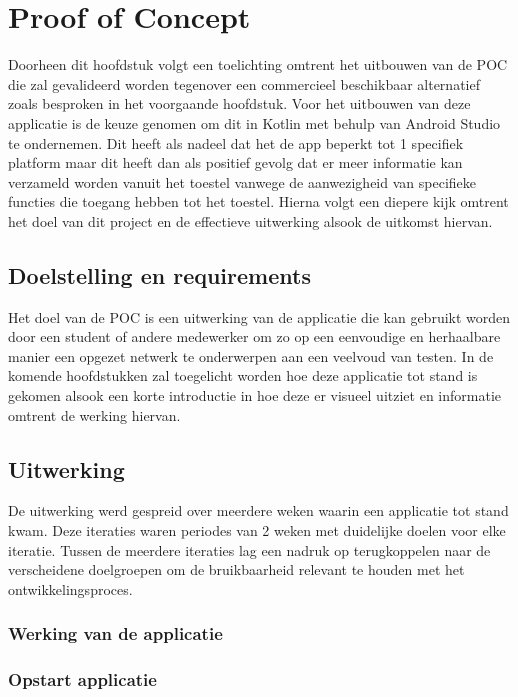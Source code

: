 \chapter{Proof of Concept}%
\label{ch:proofofconcept}

Doorheen dit hoofdstuk volgt een toelichting omtrent het uitbouwen van de POC die zal gevalideerd worden tegenover een commercieel beschikbaar alternatief zoals besproken in het voorgaande hoofdstuk. Voor het uitbouwen van deze applicatie is de keuze genomen om dit in Kotlin met behulp van Android Studio te ondernemen. Dit heeft als nadeel dat het de app beperkt tot 1 specifiek platform maar dit heeft dan als positief gevolg dat er meer informatie kan verzameld worden vanuit het toestel vanwege de aanwezigheid van specifieke functies die toegang hebben tot het toestel. Hierna volgt een diepere kijk omtrent het doel van dit project en de effectieve uitwerking alsook de uitkomst hiervan. 

\section{Doelstelling en requirements}

Het doel van de POC is een uitwerking van de applicatie die kan gebruikt worden door een student of andere medewerker om zo op een eenvoudige en herhaalbare manier een opgezet netwerk te onderwerpen aan een veelvoud van testen. In de komende hoofdstukken zal toegelicht worden hoe deze applicatie tot stand is gekomen alsook een korte introductie in hoe deze er visueel uitziet en informatie omtrent de werking hiervan. 

\section{Uitwerking}

De uitwerking werd gespreid over meerdere weken waarin een applicatie tot stand kwam. Deze iteraties waren periodes van 2 weken met duidelijke doelen voor elke iteratie. Tussen de meerdere iteraties lag een nadruk op terugkoppelen naar de verscheidene doelgroepen om de bruikbaarheid relevant te houden met het ontwikkelingsproces. 

\subsection{Werking van de applicatie}

\subsection{Opstart applicatie}

